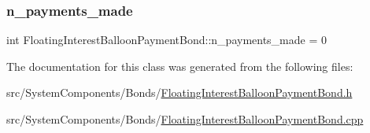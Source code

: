 \subsubsection{\texorpdfstring{n\+\_\+payments\+\_\+made}{n\_payments\_made}}
{\footnotesize\ttfamily int Floating\+Interest\+Balloon\+Payment\+Bond\+::n\+\_\+payments\+\_\+made = 0\hspace{0.3cm}{\ttfamily [private]}}



The documentation for this class was generated from the following files\+:\begin{DoxyCompactItemize}
\item 
src/\+System\+Components/\+Bonds/\mbox{\hyperlink{FloatingInterestBalloonPaymentBond_8h}{Floating\+Interest\+Balloon\+Payment\+Bond.\+h}}\item 
src/\+System\+Components/\+Bonds/\mbox{\hyperlink{FloatingInterestBalloonPaymentBond_8cpp}{Floating\+Interest\+Balloon\+Payment\+Bond.\+cpp}}\end{DoxyCompactItemize}
